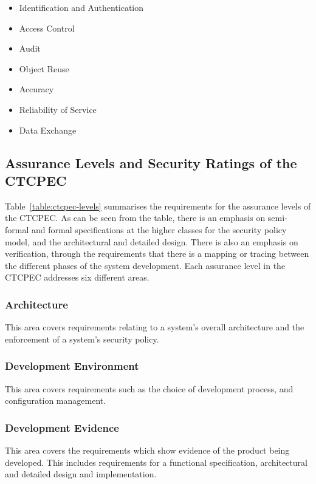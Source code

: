    \begin{itemize}
        \item Identification and Authentication
        \item Access Control
        \item Audit
        \item Object Reuse
        \item Accuracy
        \item Reliability of Service
        \item Data Exchange
    \end{itemize}

\subsection{Assurance Levels and Security Ratings of the CTCPEC}
\label{ctcpec-classes}

    Table~\ref{table:ctcpec-levels} summarises the requirements for the assurance levels of the CTCPEC.
    As can be seen from the table, there is an emphasis on semi-formal and formal specifications
    at the higher classes for the security policy model, and the architectural and detailed design.
    There is also an emphasis on verification, through the requirements that there is a mapping
    or tracing between the different phases of the system development.
    Each assurance level in the CTCPEC addresses six different areas.

    \subsubsection{Architecture}
    This area covers requirements relating to a system's overall architecture and the enforcement
    of a system's security policy.

    \subsubsection{Development Environment}
    This area covers requirements such as the choice of development process, and configuration management.

    \subsubsection{Development Evidence}
    This area covers the requirements which show evidence of the product being developed.
    This includes requirements for a functional specification, architectural and detailed design
    and implementation.
    
